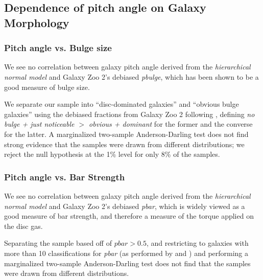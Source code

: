 \subsection{Dependence of pitch angle on Galaxy Morphology}
\label{section:morphology_comparision}
\subsubsection{Pitch angle vs. Bulge size}
We see no correlation between galaxy pitch angle derived from the \textit{hierarchical normal model} and Galaxy Zoo 2's debiased \citep{Willett2013:1308.3496v2} \textit{pbulge}, which has been shown to be a good measure of bulge size.

We separate our sample into ``disc-dominated galaxies'' and ``obvious bulge galaxies'' using the debiased fractions from Galaxy Zoo 2 following \citet{2017MNRAS.469.3363K}, defining \textit{no bulge + just noticeable $>$ obvious + dominant} for the former and the converse for the latter. A marginalized two-sample Anderson-Darling test \citep{doi:10.1080/01621459.1987.10478517} does not find strong evidence that the samples were drawn from different distributions; we reject the null hypothesis at the 1\% level for only 8\% of the samples.


\subsubsection{Pitch angle vs. Bar Strength}
We see no correlation between galaxy pitch angle derived from the \textit{hierarchical normal model} and Galaxy Zoo 2's debiased \textit{pbar}, which is widely viewed as a good measure of bar strength, and therefore a measure of the torque applied on the disc gas.

Separating the sample based off of $\mathrm{\textit{pbar}} > 0.5$, and restricting to galaxies with more than 10 classifications for \textit{pbar} (as performed by \citealt{2011MNRAS.411.2026M} and \citealt{2017MNRAS.469.3363K}) and performing a marginalized two-sample Anderson-Darling test does not find that the samples were drawn from different distributions. 


